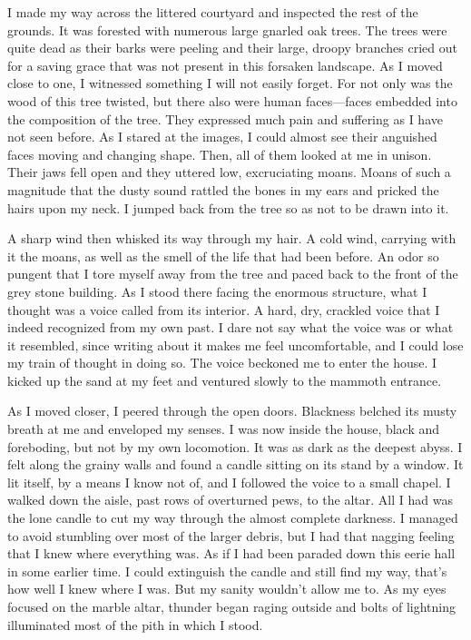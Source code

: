 I made my way across the littered courtyard and inspected the rest of
the grounds. It was forested with numerous large gnarled oak trees. The
trees were quite dead as their barks were peeling and their large,
droopy branches cried out for a saving grace that was not present in
this forsaken landscape. As I moved close to one, I witnessed something
I will not easily forget. For not only was the wood of this tree
twisted, but there also were human faces---faces embedded into the
composition of the tree. They expressed much pain and suffering as I
have not seen before. As I stared at the images, I could almost see
their anguished faces moving and changing shape. Then, all of them
looked at me in unison. Their jaws fell open and they uttered low,
excruciating moans. Moans of such a magnitude that the dusty sound
rattled the bones in my ears and pricked the hairs upon my neck. I
jumped back from the tree so as not to be drawn into it.

A sharp wind then whisked its way through my hair. A cold wind, carrying
with it the moans, as well as the smell of the life that had been
before. An odor so pungent that I tore myself away from the tree and
paced back to the front of the grey stone building. As I stood there
facing the enormous structure, what I thought was a voice called from
its interior. A hard, dry, crackled voice that I indeed recognized from
my own past. I dare not say what the voice was or what it resembled,
since writing about it makes me feel uncomfortable, and I could lose my
train of thought in doing so. The voice beckoned me to enter the house.
I kicked up the sand at my feet and ventured slowly to the mammoth
entrance.

As I moved closer, I peered through the open doors. Blackness belched
its musty breath at me and enveloped my senses. I was now inside the
house, black and foreboding, but not by my own locomotion. It was as
dark as the deepest abyss. I felt along the grainy walls and found a
candle sitting on its stand by a window. It lit itself, by a means I
know not of, and I followed the voice to a small chapel. I walked down
the aisle, past rows of overturned pews, to the altar. All I had was the
lone candle to cut my way through the almost complete darkness. I
managed to avoid stumbling over most of the larger debris, but I had
that nagging feeling that I knew where everything was. As if I had been
paraded down this eerie hall in some earlier time. I could extinguish
the candle and still find my way, that's how well I knew where I was.
But my sanity wouldn't allow me to. As my eyes focused on the marble
altar, thunder began raging outside and bolts of lightning illuminated
most of the pith in which I stood.

